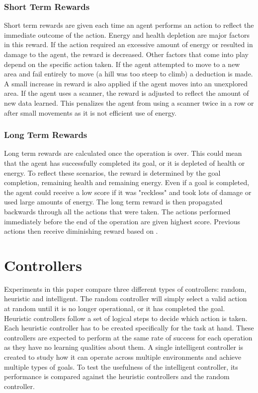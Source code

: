\subsubsection{Short Term Rewards}
Short term rewards are given each time an agent performs an action to reflect the immediate outcome of the action.
Energy and health depletion are major factors in this reward.
If the action required an excessive amount of energy or resulted in damage to the agent, the reward is decreased.
Other factors that come into play depend on the specific action taken.
If the agent attempted to move to a new area and fail entirely to move (a hill was too steep to climb) a deduction is made.
A small increase in reward is also applied if the agent moves into an unexplored area.
If the agent uses a scanner, the reward is adjusted to reflect the amount of new data learned.
This penalizes the agent from using a scanner twice in a row or after small movements as it is not efficient use of energy.

\subsubsection{Long Term Rewards}
Long term rewards are calculated once the operation is over.
This could mean that the agent has successfully completed its goal, or it is depleted of health or energy.
To reflect these scenarios, the reward is determined by the goal completion, remaining health and remaining energy. 
Even if a goal is completed, the agent could receive a low score if it was "reckless" and took lots of damage or used large amounts of energy.
The long term reward is then propagated backwards through all the actions that were taken.
The actions performed immediately before the end of the operation are given highest score.
Previous actions then receive diminishing reward based on .



\section{Controllers} \label{controllers}
Experiments in this paper compare three different types of controllers: random, heuristic and intelligent.
The random controller will simply select a valid action at random until it is no longer operational, or it has completed the goal.
Heuristic controllers follow a set of logical steps to decide which action is taken.
Each heuristic controller has to be created specifically for the task at hand.
These controllers are expected to perform at the same rate of success for each operation as they have no learning qualities about them.
A single intelligent controller is created to study how it can operate across multiple environments and achieve multiple types of goals.
To test the usefulness of the intelligent controller, its performance is compared against the heuristic controllers and the random controller.


